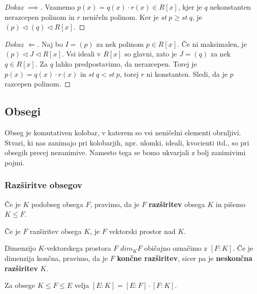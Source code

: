 \documentclass[11pt, a4paper]{article}
\begin{document}
    \begin{proof}[Dokaz \(\implies\)]
      Vzamemo \(p(x) = q(x) \cdot r(x) \in R[x]\), kjer je \(q\) nekonstanten nerazcepen polinom in \(r\) neničeln polinom. Ker je \(st\ p \ge st\ q\), je \((p) \triangleleft (q) \triangleleft R[x]\). 
    \end{proof}

    \begin{proof}[Dokaz \(\Longleftarrow\)]
        Naj bo \(I = (p)\) za nek polinom \(p \in R[x]\). Če ni maksimalen, je \((p) \triangleleft J \triangleleft R[x]\). Vsi ideali v \(R[x]\) so glavni, zato je \(J = (q)\) za nek \(q \in R[x]\). Za \(q\) lahko predpostavimo, da nerazcepen. Torej je \(p(x) = q(x) \cdot r(x)\) in \(st\ q < st\ p\), torej \(r\) ni konstanten. Sledi, da je \(p\) razcepen polinom.
    \end{proof}


    \pagebreak
    \subsection{Obsegi}

    Obseg je komutativen kolobar, v katerem so vsi neničelni elementi obrnljivi. Stvari, ki nas zanimajo pri kolobarjih, npr. ulomki, ideali, kvocienti itd., so pri obsegih precej nezanimive. Namesto tega se bomo ukvarjali z bolj zanimivimi pojmi.

    \subsubsection{Razširitve obsegov}

    \begin{definition}
        Če je \(K\) podobseg obsega \(F\), pravimo, da je \(F\) \textbf{razširitev} obsega \(K\) in pišemo \(K \le F\).
    \end{definition}

    \begin{proposition}
        Če je \(F\) razširitev obsega \(K\), je \(F\) vektorski prostor nad \(K\).
    \end{proposition}

    Dimenzijo \(K\)-vektorskega prostora \(F\) \(dim_{K}F\) običajno označimo z \([F:K]\). Če je dimenzija končna, pravimo, da je \(F\) \textbf{končne razširitev}, sicer pa je \textbf{neskončna razširitev} \(K\).

    \begin{theorem}
        Za obsege \(K \le F \le E\) velja \([E:K] = [E:F] \cdot [F:K]\).
    \end{theorem}
\end{document}
